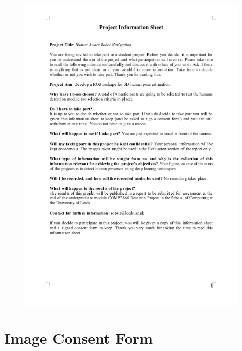 \begin{appendices}
\begin{figure}[H]
  \begin{center}
    \includegraphics[width=.9\linewidth]{images/appendix_consent_info.png}
  \end{center}
\end{figure}

\chapter{Image Consent Form}


\end{appendices}
